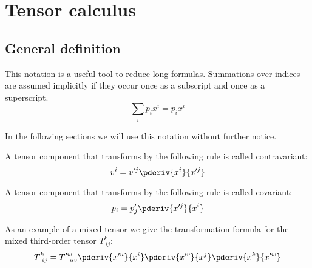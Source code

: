 \chapter{Tensor calculus}
\section{General definition}
	\begin{definition}
    	This notation is a useful tool to reduce long formulas. Summations over indices are assumed implicitly if they occur once as a subscript and once as a superscript.
        \begin{equation}
			\label{tensorcalculus:einstein_summation}
            \sum_ip_ix^i = p_ix^i
		\end{equation}
	\end{definition}
	In the following sections we will use this notation without further notice.

	\begin{definition}[Contravariant]
		A tensor component that transforms by the following rule is called contravariant:
        \begin{equation}
			\label{tensorcalculus:contravariant}
            v^i = v'^j\pderiv{x^i}{x'^j}
		\end{equation}
	\end{definition}
    
    \begin{definition}[Covariant]
		A tensor component that transforms by the following rule is called covariant:
        \begin{equation}
			\label{tensorcalculus:covariant}
            p_i = p'_j\pderiv{x'^j}{x^i}
		\end{equation}
	\end{definition}
    
    \begin{example}
		As an example of a mixed tensor we give the transformation formula for the mixed third-order tensor $T_{\ ij}^k$:
        \[
        	T_{\ ij}^k = T_{\ \ uv}'^w\pderiv{x'^u}{x^i}\pderiv{x'^v}{x^j}\pderiv{x^k}{x'^w}
        \]
	\end{example}
    
